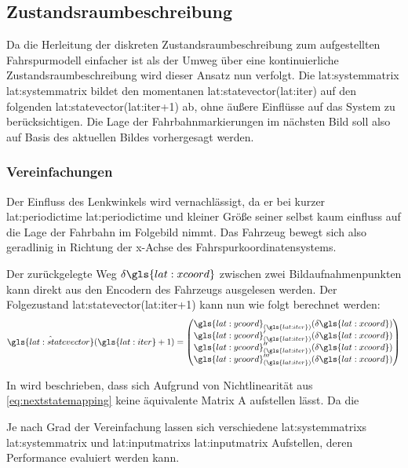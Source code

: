 \subsection{Zustandsraumbeschreibung}
Da die Herleitung der diskreten Zustandsraumbeschreibung zum aufgestellten Fahrspurmodell einfacher ist als der Umweg über eine kontinuierliche Zustandsraumbeschreibung  wird dieser Ansatz nun verfolgt.
Die \glsdesc{lat:systemmatrix} \gls{lat:systemmatrix} bildet den momentanen  \gls{lat:statevector}(\gls{lat:iter}) auf den folgenden \gls{lat:statevector}(\gls{lat:iter}+1) ab, ohne äußere Einflüsse auf das System zu berücksichtigen. Die Lage der Fahrbahnmarkierungen im nächsten Bild soll also auf Basis des aktuellen Bildes vorhergesagt werden.

\subsubsection{Vereinfachungen}
Der Einfluss des Lenkwinkels wird vernachlässigt, da er bei kurzer \glsdesc{lat:periodictime} \gls{lat:periodictime} und kleiner Größe seiner selbst kaum einfluss auf die Lage der Fahrbahn im Folgebild nimmt. Das Fahrzeug bewegt sich also geradlinig in Richtung der x-Achse des Fahrspurkoordinatensystems. 

Der zurückgelegte Weg \begin{math} \delta \gls{lat:xcoord} \end{math} zwischen zwei Bildaufnahmenpunkten kann direkt aus den Encodern des Fahrzeugs ausgelesen werden. Der Folgezustand  \gls{lat:statevector}(\gls{lat:iter}+1) kann nun wie folgt berechnet werden:
\begin{equation}
\label{eq:nextstatemapping}
\hat{\gls{lat:statevector}}(\gls{lat:iter}+1) =
\begin{pmatrix}
\gls{lat:ycoord}_{(\gls{lat:iter})}(\delta \gls{lat:xcoord}) \\
\gls{lat:ycoord}_{(\gls{lat:iter})}^\prime(\delta \gls{lat:xcoord}) \\
\gls{lat:ycoord}_{(\gls{lat:iter})}^{\prime\prime}(\delta \gls{lat:xcoord}) \\
\gls{lat:ycoord}_{(\gls{lat:iter})}^{\prime\prime\prime}(\delta \gls{lat:xcoord}) \\
\end{pmatrix}
\end{equation}

In \autocite{petersfalkoFPGAbasierteBildverarbeitungspipelineZur2009} wird beschrieben, dass sich Aufgrund von Nichtlinearität aus \ref{eq:nextstatemapping} keine äquivalente Matrix A aufstellen lässt. Da die 

Je nach Grad der Vereinfachung lassen sich verschiedene \glspl{lat:systemmatrix} \gls{lat:systemmatrix} und \glspl{lat:inputmatrix} \gls{lat:inputmatrix} Aufstellen, deren Performance evaluiert werden kann.

